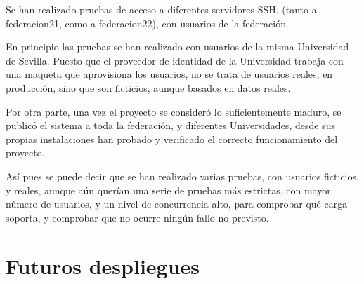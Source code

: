     Se han realizado pruebas de acceso a diferentes servidores SSH, (tanto a
    federacion21, como a federacion22), con usuarios de la federación.

    En principio las pruebas se han realizado con usuarios de la misma
    Universidad de Sevilla. Puesto que el proveedor de identidad de la
    Universidad trabaja con una maqueta que aprovisiona los usuarios, no se
    trata de usuarios reales, en producción, sino que son ficticios, aunque
    basados en datos reales.

    Por otra parte, una vez el proyecto se consideró lo suficientemente
    maduro, se publicó el sistema a toda la federación, y diferentes
    Universidades, desde sus propias instalaciones han probado y verificado
    el correcto funcionamiento del proyecto.

    Así pues se puede decir que se han realizado varias pruebas, con
    usuarios ficticios, y reales, aunque aún querían una serie de pruebas
    más estrictas, con mayor número de usuarios, y un nivel de concurrencia
    alto, para comprobar qué carga soporta, y comprobar que no ocurre
    ningún fallo no previsto.

\section{Futuros despliegues}

